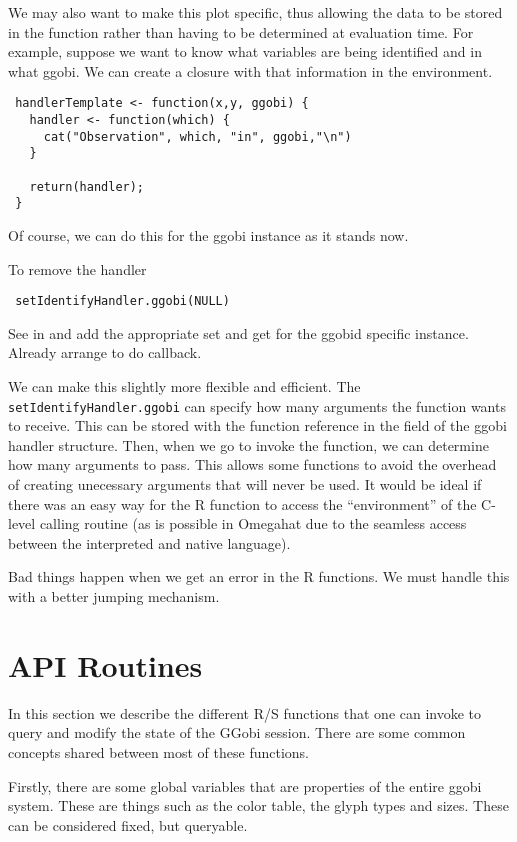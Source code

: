 \documentclass{article}
\def\SFunction#1{{\texttt{\red #1}}}
\begin{document}
We may also want to make this plot specific, thus allowing the data to
be stored in the function rather than having to be determined at
evaluation time. For example, suppose we want to know what variables
are being identified and in what ggobi.  We can create a closure with
that information in the environment.
\begin{verbatim}
 handlerTemplate <- function(x,y, ggobi) {
   handler <- function(which) {
     cat("Observation", which, "in", ggobi,"\n")    
   }

   return(handler);
 }
\end{verbatim}
Of course, we can do this for the ggobi instance
as it stands now.

To remove the handler
\begin{verbatim}
 setIdentifyHandler.ggobi(NULL)
\end{verbatim}

See  in  and add the appropriate
set and get for the ggobid specific instance.  Already arrange to do
callback.

We can make this slightly more flexible and efficient.  The
\SFunction{setIdentifyHandler.ggobi} can specify how many arguments
the function wants to receive.  This can be stored with the function
reference in the  field of the ggobi handler
structure. Then, when we go to invoke the function, we can determine
how many arguments to pass.  This allows some functions to avoid the
overhead of creating unecessary arguments that will never be used.  It
would be ideal if there was an easy way for the R function to access
the ``environment'' of the C-level calling routine (as is possible in
Omegahat due to the seamless access between the interpreted and native
language).


Bad things happen when we get an error in the R functions.  We must
handle this with a better jumping mechanism.


\section{API Routines}
In this section we describe the different R/S functions that one can
invoke to query and modify the state of the GGobi session.  There are
some common concepts shared between most of these functions.

Firstly, there are some global variables that are properties of the
entire ggobi system.  These are things such as the color table, the
glyph types and sizes.  These can be considered fixed, but queryable.
\end{document}
